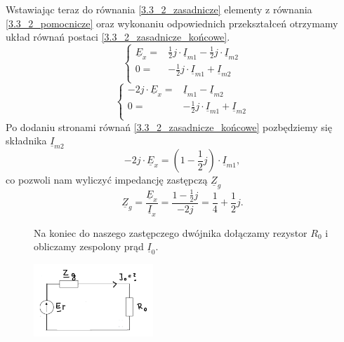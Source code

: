 \documentclass[12pt, a4paper]{article}
\begin{document}
Wstawiając teraz do równania \ref{3.3_2_zasadnicze} elementy z równania
\ref{3.3_2_pomocnicze} oraz wykonaniu odpowiednich przekształceń otrzymamy układ równań postaci
\ref{3.3_2_zasadnicze_końcowe}.
\begin{equation*}
  \left\{
  \begin{array}{rl}
    \underline{E}_x = & \frac{1}{2}j\cdot\underline{I}_{m1}- \frac{1}{2}j\cdot\underline{I}_{m2} \\
    0 =               & -\frac{1}{2}j\cdot\underline{I}_{m1} + \underline{I}_{m2}                \\
  \end{array}
  \right.
\end{equation*}
\begin{equation}\label{3.3_2_zasadnicze_końcowe}
  \left\{
  \begin{array}{rl}
    -2j\cdot\underline{E}_x = & \underline{I}_{m1}-\underline{I}_{m2}                     \\
    0 =                       & -\frac{1}{2}j\cdot\underline{I}_{m1} + \underline{I}_{m2} \\
  \end{array}
  \right.
\end{equation}
Po dodaniu stronami równań \ref{3.3_2_zasadnicze_końcowe} pozbędziemy się składnika
$\underline{I}_{m2}$
\begin{equation*}
  -2j\cdot\underline{E}_x = \left(1-\frac{1}{2}j\right)\cdot\underline{I}_{m1},
\end{equation*}
co pozwoli nam wyliczyć impedancję zastępczą $\underline{Z}_g$
\begin{equation*}
  \underline{Z}_g = \frac{\underline{E}_x}{\underline{I}_x} = \frac{1-\frac{1}{2}j}{-2j}
  = \frac{1}{4} + \frac{1}{2}j.
\end{equation*}


\begin{figure}[H]
  \begin{flushleft}
    Na koniec do naszego zastępczego dwójnika dołączamy rezystor $R_0$ i obliczamy
    zespolony prąd $\underline{I}_0$.
  \end{flushleft}
  \centering
  \includegraphics[width = 0.4\textwidth]{./images/Lista_3/3.3.3.png}
\end{figure}
\end{document}
